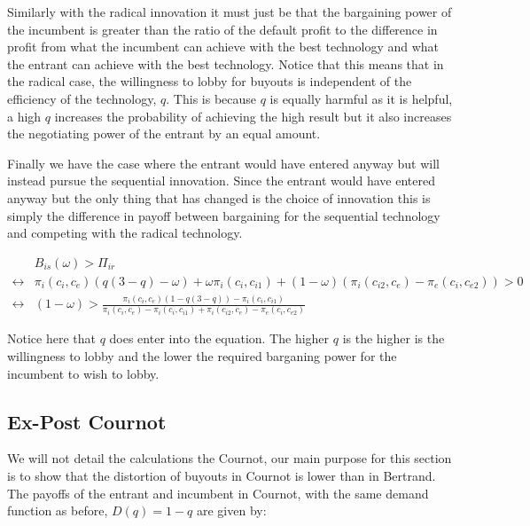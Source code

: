 \documentclass[11pt]{article}
\begin{document}
Similarly with the radical innovation it must just be that the bargaining power of the incumbent is greater than the ratio of the default profit to the difference in profit from what the incumbent can achieve with the best technology and what the entrant can achieve with the best technology. Notice that this means that in the radical case, the willingness to lobby for buyouts is independent of the efficiency of the technology, $q$. This is because $q$ is equally harmful as it is helpful, a high $q$ increases the probability of achieving the high result but it also increases the negotiating power of the entrant by an equal amount. 

Finally we have the case where the entrant would have entered anyway but will instead pursue the sequential innovation. Since the entrant would have entered anyway but the only thing that has changed is the choice of innovation this is simply the difference in payoff between bargaining for the sequential technology and competing with the radical technology. 

\begin{align*}
&B_{is}(\omega)>\Pi_{ir} \\
\leftrightarrow &\pi_i(c_i,c_e)(q(3-q) -\omega) 
+\omega \pi_i(c_i,c_{i1}) 
 +(1-\omega)(\pi_i(c_{i2},c_e)-\pi_e(c_{i},c_{e2})) 
> 0 \\
\leftrightarrow &
(1-\omega)> \frac{\pi_i(c_i,c_e)(1-q(3-q))-\pi_i(c_i,c_{i1})}{\pi_i(c_i,c_e)-\pi_i(c_i,c_{i1})+\pi_i(c_{i2},c_e)-\pi_e(c_{i},c_{e2})}  
\end{align*}

Notice here that $q$ does enter into the equation. The higher $q$ is the higher is the willingness to lobby and the lower the required barganing power for the incumbent to wish to lobby. 

\subsection{Ex-Post Cournot}

We will not detail the calculations the Cournot, our main purpose for this section is to show that the distortion of buyouts in Cournot is lower than in Bertrand. The payoffs of the entrant and incumbent in Cournot, with the same demand function as before, $D(q)=1-q$ are given by:
\end{document}
